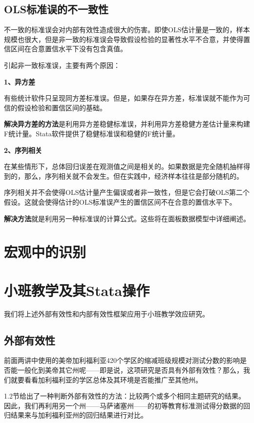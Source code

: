\documentclass[cn,10pt,math=newtx,citestyle=gb7714-2015,bibstyle=gb7714-2015]{elegantbook}
\begin{document}
\subsection{OLS标准误的不一致性}
不一致的标准误会对内部有效性造成很大的伤害。即使OLS估计量是一致的，样本规模也很大，但是非一致的标准误会导致假设检验的显著性水平不合意，并使得置信区间在合意置信水平下没有包含真值。

引起非一致标准误，主要有两个原因：

\textbf{1、异方差}

有些统计软件只呈现同方差标准误。但是，如果存在异方差，标准误就不能作为可信的假设检验和置信区间的基础。

\textbf{解决异方差的方法}是利用异方差稳健标准误，并利用异方差稳健方差估计量来构建F统计量。Stata软件提供了稳健标准误和稳健的F统计量。

\textbf{2、序列相关}

在某些情形下，总体回归误差在观测值之间是相关的。如果数据是完全随机抽样得到的，那么，序列相关就不会发生。但在实践中，经济样本往往是部分随机的。

序列相关并不会使得OLS估计量产生偏误或者非一致性，但是它会打破OLS第二个假设。这就会使得估计的OLS标准误产生的置信区间不在合意的置信水平下。

\textbf{解决方法}就是利用另一种标准误的计算公式。这些将在面板数据模型中详细阐述。

\section{宏观中的识别}

\section{小班教学及其Stata操作}
我们将上述外部有效性和内部有效性框架应用于小班教学效应研究。

\subsection{外部有效性}
前面两讲中使用的美帝加利福利亚420个学区的缩减班级规模对测试分数的影响是否能一般化到美帝其它州呢——即是说，这项研究是否具有外部有效性？那么，我们就要看看加利福利亚的学区总体及其环境是否能推广至其他州。

1.2节给出了一种判断外部有效性的方法：比较两个或多个相同主题研究的结果。因此，我们再利用另一个州——马萨诸塞州——的初等教育标准测试得分数据的回归结果来与加利福利亚州的回归结果进行对比。
\end{document}
